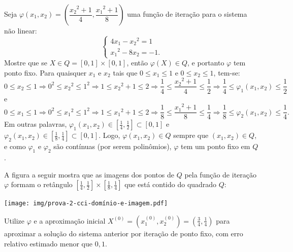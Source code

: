\documentclass[12pt,a4paper]{article}
\begin{document}
\begin{ExerciseList}
\Exercise[title={2,0}]
Seja $\varphi(x_1, x_2) = \left(\dfrac{{x_2}^2+1}{4}, \dfrac{{x_1}^2+1}{8}\right)$ uma função de iteração para o sistema não linear:
\[
  \begin{cases}
  4x_1-{x_2}^2 = 1\\
  {x_1}^2-8x_2 = -1.
  \end{cases}
\]
Mostre que se $X \in Q = [0, 1] \times [0,1]$, então $\varphi(X) \in Q$, e portanto $\varphi$ tem ponto fixo.
\Answer Para quaisquer $x_1$ e $x_2$ tais que $0 \leq x_1 \leq 1$ e $0 \leq x_2 \leq 1$, tem-se:
\[
  0 \leq x_2 \leq 1
  \Rightarrow
  0^2 \leq {x_2}^2 \leq 1^2
  \Rightarrow
  1 \leq {x_2}^2+1 \leq 2
  \Rightarrow
  \frac{1}{4} \leq \frac{{x_2}^2+1}{4} \leq \frac{1}{2}
  \Rightarrow
  \frac{1}{4} \leq \varphi_1(x_1, x_2) \leq \frac{1}{2}
\]
e
\[
  0 \leq x_1 \leq 1
  \Rightarrow
  0^2 \leq {x_1}^2 \leq 1^2
  \Rightarrow
  1 \leq {x_1}^2+1 \leq 2
  \Rightarrow
  \frac{1}{8} \leq \frac{{x_1}^2+1}{8} \leq \frac{1}{4}
  \Rightarrow
  \frac{1}{8} \leq \varphi_2(x_1, x_2) \leq \frac{1}{4}.
\]
Em outras palavras, $\varphi_1(x_1, x_2) \in \left[\frac{1}{4}, \frac{1}{2}\right] \subset [0, 1]$ e $\varphi_2(x_1, x_2) \in \left[\frac{1}{8}, \frac{1}{4}\right] \subset [0, 1]$. Logo, $\varphi(x_1, x_2) \in Q$ sempre que $(x_1, x_2) \in Q$, e como $\varphi_1$ e $\varphi_2$ são contínuas (por serem polinômios), $\varphi$ tem um ponto fixo em $Q$.

A figura a seguir mostra que as imagens dos pontos de $Q$ pela função de iteração $\varphi$ formam o retângulo $\left[\frac{1}{4}, \frac{1}{2}\right] \times [\frac{1}{8}, \frac{1}{4}]$ que está contido do quadrado $Q$:

\begin{center}
  \texttt{[image: img/prova-2-cci-domínio-e-imagem.pdf]}
\end{center}

\Exercise[title={2,0}] Utilize $\varphi$ e a aproximação inicial $X^{(0)}=(x_1^{(0)}, x_2^{(0)}) = (\frac{3}{4}, \frac{1}{4})$ para aproximar a solução do sistema anterior por iteração de ponto fixo, com erro relativo estimado menor que $0,1$.


\end{ExerciseList}
\end{document}
